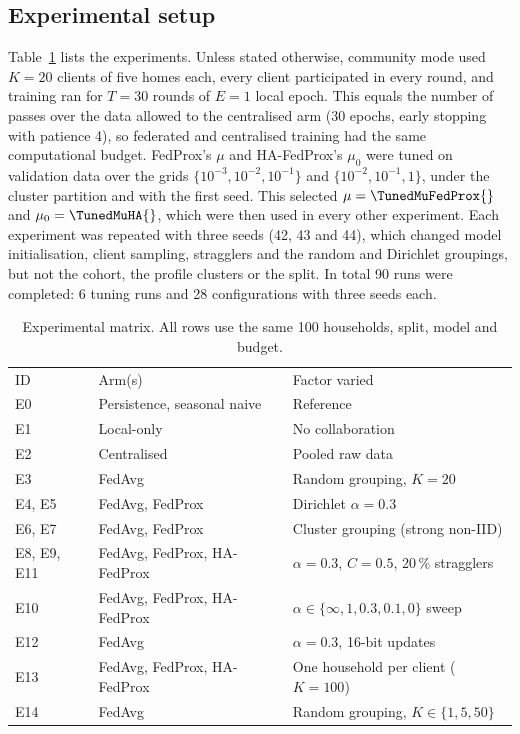 \subsection{Experimental setup}
Table~\ref{tab:matrix} lists the experiments. Unless stated otherwise, community mode used $K=20$ clients of five homes
each, every client participated in every round, and training ran for $T=30$ rounds of $E=1$ local epoch. This equals
the number of passes over the data allowed to the centralised arm (30 epochs, early stopping with patience 4), so
federated and centralised training had the same computational budget. FedProx's $\mu$ and HA-FedProx's $\mu_0$ were
tuned on validation data over the grids $\{10^{-3},10^{-2},10^{-1}\}$ and $\{10^{-2},10^{-1},1\}$, under the cluster
partition and with the first seed. This selected $\mu=\TunedMuFedProx{}$ and $\mu_0=\TunedMuHA{}$, which were then used
in every other experiment. Each experiment was repeated with three seeds (42, 43 and 44), which changed model
initialisation, client sampling, stragglers and the random and Dirichlet groupings, but not the cohort, the profile
clusters or the split. In total 90 runs were completed: 6 tuning runs and 28 configurations with three seeds each.

\begin{table}
\caption{Experimental matrix. All rows use the same 100 households, split, model and budget.}\label{tab:matrix}
\begin{tabular}{lll}
ID & Arm(s) & Factor varied \\
E0 & Persistence, seasonal naive & Reference \\
E1 & Local-only & No collaboration \\
E2 & Centralised & Pooled raw data \\
E3 & FedAvg & Random grouping, $K=20$ \\
E4, E5 & FedAvg, FedProx & Dirichlet $\alpha=0.3$ \\
E6, E7 & FedAvg, FedProx & Cluster grouping (strong non-IID) \\
E8, E9, E11 & FedAvg, FedProx, HA-FedProx & $\alpha=0.3$, $C=0.5$, 20\,\% stragglers \\
E10 & FedAvg, FedProx, HA-FedProx & $\alpha\in\{\infty,1,0.3,0.1,0\}$ sweep \\
E12 & FedAvg & $\alpha=0.3$, 16-bit updates \\
E13 & FedAvg, FedProx, HA-FedProx & One household per client ($K=100$) \\
E14 & FedAvg & Random grouping, $K\in\{1,5,50\}$ \\
\end{tabular}
\end{table}

